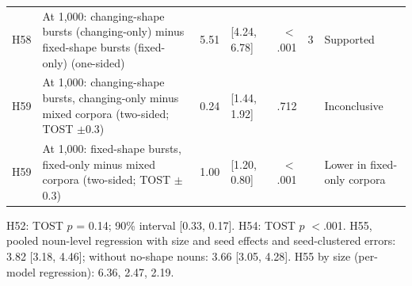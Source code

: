 \begin{table}[!htbp]
\begin{tabular}{@{}l>{\raggedright\arraybackslash}p{}rlrc>{\raggedright\arraybackslash}p{}@{}}
H58 & At 1,000: changing-shape bursts (changing-only) minus fixed-shape bursts (fixed-only) (one-sided) & 5.51 & [4.24, 6.78] & $<$.001 & 3 & Supported \\
H59 & At 1,000: changing-shape bursts, changing-only minus mixed corpora (two-sided; TOST $\pm$0.3) & 0.24 & [\textminus{}1.44, 1.92] & .712 &  & Inconclusive \\
H59 & At 1,000: fixed-shape bursts, fixed-only minus mixed corpora (two-sided; TOST $\pm$0.3) & \textminus{}1.00 & [\textminus{}1.20, \textminus{}0.80] & $<$.001 &  & Lower in fixed-only corpora \\
\bottomrule
\end{tabular}
\par\smallskip\parbox{\textwidth}{\footnotesize H52: TOST $p$ = 0.14; 90\% interval [\textminus{}0.33, \textminus{}0.17]. H54: TOST $p$ $<$.001. H55, pooled noun-level regression with size and seed effects and seed-clustered errors: 3.82 [3.18, 4.46]; without no-shape nouns: 3.66 [3.05, 4.28]. H55 by size (per-model regression): 6.36, 2.47, 2.19.}
\end{table}

\begin{table}[!htbp]
\centering\small
\caption{Experiment 3: copy score by corpus design, history and exposures (means over seeds by size, and seed-level mean with 95\% interval, sizes averaged). Mixed: ten seeds; single-history designs: five seeds. $^a$Over the three smaller sizes, as in the registered tests; 85.6M models were trained in the mixed design only.}
\label{tab:O2}
\setlength{\tabcolsep}{3pt}

\end{table}

\begin{table}[!htbp]
\centering\small
\caption{Experiment 3, mixed design, 1,000 exposures: copy score when the context sentence is about a noun of one history (rows) and the query names a different noun of the same or another history (columns); means over ten seeds, sizes averaged (24 items per pair and model). Every item names a different noun in the query, so the diagonal is not comparable with the same-noun copy scores of Table~\ref{tab:O2}.}
\label{tab:O3}

\end{table}

